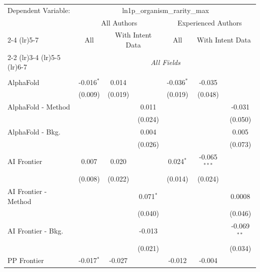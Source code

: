 \begingroup
\centering
\begin{tabular}{lcccccc}
   \tabularnewline \midrule \midrule
   Dependent Variable: & \multicolumn{6}{c}{ln1p\_organism\_rarity\_max}\\
 & \multicolumn{3}{c}{All Authors} & \multicolumn{3}{c}{Experienced Authors} \\
\cmidrule(lr){2-4} \cmidrule(lr){5-7}
 & \multicolumn{1}{c}{All} & \multicolumn{2}{c}{With Intent Data} & \multicolumn{1}{c}{All} & \multicolumn{2}{c}{With Intent Data} \\
\cmidrule(lr){2-2} \cmidrule(lr){3-4} \cmidrule(lr){5-5} \cmidrule(lr){6-7}
 & \multicolumn{6}{c}{\textit{All Fields}} \\ \\
   AlphaFold            & -0.016$^{*}$ & 0.014   &               & -0.036$^{*}$ & -0.035         &   \\   
                        & (0.009)      & (0.019) &               & (0.019)      & (0.048)        &   \\   
   AlphaFold - Method   &              &         & 0.011         &              &                & -0.031\\   
                        &              &         & (0.024)       &              &                & (0.050)\\   
   AlphaFold - Bkg.     &              &         & 0.004         &              &                & 0.005\\   
                        &              &         & (0.026)       &              &                & (0.073)\\   
   AI Frontier          & 0.007        & 0.020   &               & 0.024$^{*}$  & -0.065$^{***}$ &   \\   
                        & (0.008)      & (0.022) &               & (0.014)      & (0.024)        &   \\   
   AI Frontier - Method &              &         & 0.071$^{*}$   &              &                & 0.0008\\   
                        &              &         & (0.040)       &              &                & (0.046)\\   
   AI Frontier - Bkg.   &              &         & -0.013        &              &                & -0.069$^{**}$\\   
                        &              &         & (0.021)       &              &                & (0.034)\\   
   PP Frontier          & -0.017$^{*}$ & -0.027  &               & -0.012       & -0.004         &   \\   

\end{tabular}
